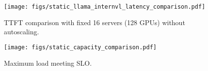 \begin{figure}[!t]
  \centering
  \texttt{[image: figs/static\_llama\_internvl\_latency\_comparison.pdf]}
  \caption{TTFT comparison with fixed 16 servers (128 GPUs) without autoscaling.}
  \label{fig:eval:static-latency}
\end{figure}

\begin{figure}[!t]
    \centering
    \texttt{[image: figs/static\_capacity\_comparison.pdf]}
    \caption{Maximum load meeting SLO.}
    \vspace{-10pt}
    \label{fig:eval:static-capacity}
\end{figure}
